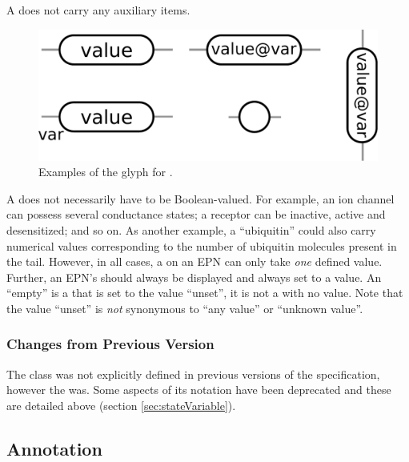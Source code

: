 \begin{glyphDescription}
\glyphAux A  does not carry any auxiliary items.  

\end{glyphDescription}

\begin{figure}[H]
  \centering
  \includegraphics[scale = 0.3, trim = 0 0 0 0.25in]{images/stateVariable}
  \caption{Examples of the \PD glyph for .}
  \label{fig:state-var}
\end{figure}

A  does not necessarily have to be
Boolean-valued.  For example, an ion channel can possess several
conductance states; a receptor can be inactive, active and
desensitized; and so on.  As another example, a 
``ubiquitin'' could also carry numerical values corresponding to the
number of ubiquitin molecules present in the tail.  However, in all
cases, a  on an EPN can only take \emph{one}
defined value.  Further, an EPN's  should always
be displayed and always set to a value.  An ``empty''  is a  that is set to the value
``unset'', it is not a  with no value. Note that
the value ``unset'' is \emph{not} synonymous to ``any value'' or
``unknown value''.


\subsubsection{Changes from Previous Version}

The  class was not explicitly defined in
previous versions of the specification, however the  was. Some aspects of its notation have been deprecated and
these are detailed above (section \ref{sec:stateVariable}).

\subsection{Annotation}
\label{defn:Annotation}

